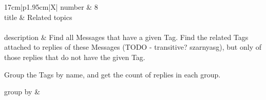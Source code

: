 \renewcommand*{\arraystretch}{1.5}
\noindent\begin{tabularx}{17cm}{|p{1.95cm}|X|}
	\hline
	number      & 8                                                          \\ \hline
	title       & Related topics                                                           \\ \hline
	 \\ \hline
	description & Find all Messages that have a given Tag. Find the related Tags attached
to replies of these Messages (TODO - transitive? szarnyasg), but only of
those replies that do not have the given Tag.

Group the Tags by name, and get the count of replies in each group.
 \\ \hline
	
	group by       &
	\\ \hline
	

\end{tabularx}
